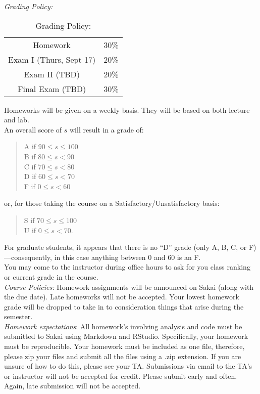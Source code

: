 \documentclass[11pt]{article}
\begin{document}
\emph{Grading Policy:} 

\begin{table}[ht]
\caption{Grading Policy:}
\begin{center}
\begin{tabular}{cc}
Homework &30\%\\
Exam I (Thurs, Sept 17) &20\%\\
Exam  II (TBD) & 20\%\\
Final Exam  (TBD) & 30\%\\
\end{tabular}
\end{center}
\label{default}
\end{table}%

Homeworks will be given on a weekly basis. They will be based on both lecture and lab. \\

An overall score of $s$ will result in a grade of:
\begin{quote}
A if $90\leq s\leq 100$ \\
B if $80\leq s < 90$ \\
C if $70\leq s < 80$ \\
D if $60\leq s < 70$ \\
F if $0\leq s < 60$
\end{quote}
or, for those taking the course on a Satisfactory/Unsatisfactory basis:
\begin{quote}
S if $70\leq s\leq 100$ \\
U if $0\leq s < 70$.
\end{quote}
For graduate students, it appears that there is no ``D'' grade (only A, B, C, or F)---consequently, in this case anything between $0$ and $60$ is an F. \\

You may come to the instructor during office hours to ask for you class ranking or current grade in the course. \\

\emph{Course Policies:} 
Homework assignments will be announced on Sakai (along with the due date). Late homeworks will not be accepted. Your lowest homework grade will be dropped to take in to consideration things that arise during the semester. \\

\emph{Homework expectations}: All homework's involving analysis and code must be submitted to Sakai using Markdown and RStudio. Specifically, your homework must be reproducible. Your homework must be included as one file, therefore, please zip your files and submit all the files using a .zip extension. If you are unsure of how to do this, please see your TA. Submissions via email to the TA's or instructor will not be accepted for credit. Please submit early and often. Again, late submission will not be accepted. \\
\end{document}
